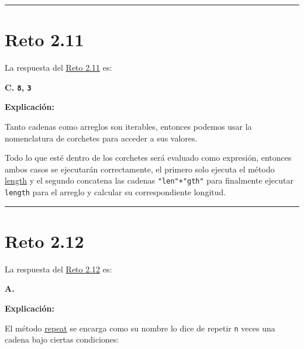 \documentclass[
  letterpaper,
  DIV=11,
  numbers=noendperiod]{scrreprt}
\newenvironment{Shaded}{\begin{snugshade}}{\end{snugshade}}
\newcommand{\BuiltInTok}[1]{\textcolor[rgb]{0.00,0.23,0.31}{#1}}
\newcommand{\DecValTok}[1]{\textcolor[rgb]{0.68,0.00,0.00}{#1}}
\newcommand{\NormalTok}[1]{\textcolor[rgb]{0.00,0.23,0.31}{#1}}
\newcommand{\OperatorTok}[1]{\textcolor[rgb]{0.37,0.37,0.37}{#1}}
\begin{document}
\begin{center}\rule{0.5\linewidth}{0.5pt}\end{center}

\section{Reto 2.11}\label{sec-sol-cap2-reto11}

La respuesta del \hyperref[sec-cap2-reto11]{Reto 2.11} es:

\textbf{C. \texttt{8}, \texttt{3}}

\textbf{Explicación:}

Tanto cadenas como arreglos son iterables, entonces podemos usar la
nomenclatura de corchetes para acceder a sus valores.

Todo lo que esté dentro de los corchetes será evaluado como expresión,
entonces ambos casos se ejecutarán correctamente, el primero solo
ejecuta el método \hyperref[glos-length]{length} y el segundo concatena
las cadenas \texttt{"len"+"gth"} para finalmente ejecutar
\texttt{length} para el arreglo y calcular su correspondiente longitud.

\begin{center}\rule{0.5\linewidth}{0.5pt}\end{center}

\section{Reto 2.12}\label{sec-sol-cap2-reto12}

La respuesta del \hyperref[sec-cap2-reto12]{Reto 2.12} es:

\textbf{A.}

\begin{Shaded}
\end{Shaded}

\textbf{Explicación:}

El método \hyperref[glos-repeat]{repeat} se encarga como su nombre lo
dice de repetir \texttt{n} veces una cadena bajo ciertas condiciones:
\end{document}
